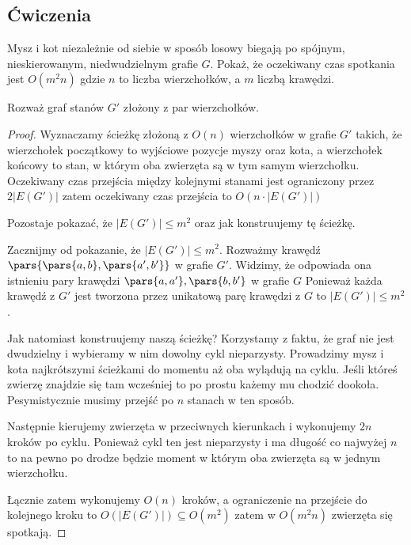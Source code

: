 \subsection{Ćwiczenia}

\begin{exercise}
	Mysz i kot niezależnie od siebie w sposób losowy biegają po spójnym, nieskierowanym, niedwudzielnym grafie \(G\).
	Pokaż, że oczekiwany czas spotkania jest \(O(m^2n)\) gdzie \(n\) to liczba wierzchołków, a \(m\) liczbą krawędzi.

	Rozważ graf stanów \(G'\) złożony z par wierzchołków.
\end{exercise}

\begin{proof}
	Wyznaczamy ścieżkę złożoną z \( O(n) \) wierzchołków w grafie \(G'\) takich, że wierzchołek początkowy
	to wyjściowe pozycje myszy oraz kota, a wierzchołek końcowy to stan, w którym oba zwierzęta są w tym samym wierzchołku.
	Oczekiwany czas przejścia między kolejnymi stanami jest ograniczony przez \( 2|E(G')| \)
	zatem oczekiwany czas przejścia to \( O(n \cdot |E(G')|) \)

	Pozostaje pokazać, że \( |E(G')| \leq m^2 \) oraz jak konstruujemy tę ścieżkę.

	Zacznijmy od pokazanie, że \( |E(G')| \leq m^2 \).
	Rozważmy krawędź \( \pars{ \pars{a, b}, \pars{a', b'}} \) w grafie \( G' \).
	Widzimy, że odpowiada ona istnieniu pary krawędzi \( \pars{a, a'}, \pars{b, b'} \) w grafie \( G \)
	Ponieważ każda krawędź z \( G' \) jest tworzona przez unikatową parę krawędzi z \( G \)
	to \( |E(G')| \leq m^2 \).

	Jak natomiast konstruujemy naszą ścieżkę?
	Korzystamy z faktu, że graf nie jest dwudzielny i wybieramy w nim dowolny cykl nieparzysty.
	Prowadzimy mysz i kota najkrótszymi ścieżkami do momentu aż oba wylądują na cyklu. Jeśli któreś zwierzę
	znajdzie się tam wcześniej to po prostu każemy mu chodzić dookoła. Pesymistycznie musimy przejść po
	\( n \) stanach w ten sposób.

	Następnie kierujemy zwierzęta w przeciwnych kierunkach i wykonujemy \( 2n \) kroków po cyklu.
	Ponieważ cykl ten jest nieparzysty i ma długość co najwyżej \( n \) to na pewno po drodze będzie moment
	w którym oba zwierzęta są w jednym wierzchołku.

	Łącznie zatem wykonujemy \( O(n) \) kroków, a ograniczenie na przejście do kolejnego kroku to \( O(|E(G')|) \subseteq O(m^2) \) zatem w \( O(m^2n) \) zwierzęta się spotkają.



\end{proof}

